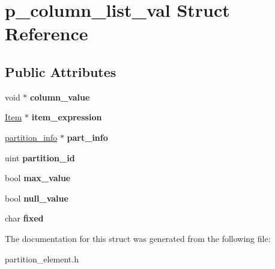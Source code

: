 \hypertarget{structp__column__list__val}{}\section{p\+\_\+column\+\_\+list\+\_\+val Struct Reference}
\label{structp__column__list__val}
\subsection*{Public Attributes}
\begin{DoxyCompactItemize}
\item 
\mbox{\label{structp__column__list__val_a73b5176fa671e75351e5615da974504a}} 
void $\ast$ {\bfseries column\+\_\+value}
\item 
\mbox{\label{structp__column__list__val_a22de5e22a4f2d1692b1e259815c491ee}} 
\mbox{\hyperlink{classItem}{Item}} $\ast$ {\bfseries item\+\_\+expression}
\item 
\mbox{\label{structp__column__list__val_a3870f34528f4b12fb01445d72ff00e74}} 
\mbox{\hyperlink{classpartition__info}{partition\+\_\+info}} $\ast$ {\bfseries part\+\_\+info}
\item 
\mbox{\label{structp__column__list__val_a6927e972e14490f3ab2e16e817262cc5}} 
uint {\bfseries partition\+\_\+id}
\item 
\mbox{\label{structp__column__list__val_a3f667f9549fadbeafa363a39386f90ca}} 
bool {\bfseries max\+\_\+value}
\item 
\mbox{\label{structp__column__list__val_a6c098c60b95cf8ecb3cd73205f4d4e81}} 
bool {\bfseries null\+\_\+value}
\item 
\mbox{\label{structp__column__list__val_a3ccb79d44ee50f6e446cfdcb5b6cde7a}} 
char {\bfseries fixed}
\end{DoxyCompactItemize}


The documentation for this struct was generated from the following file\+:\begin{DoxyCompactItemize}
\item 
partition\+\_\+element.\+h\end{DoxyCompactItemize}
